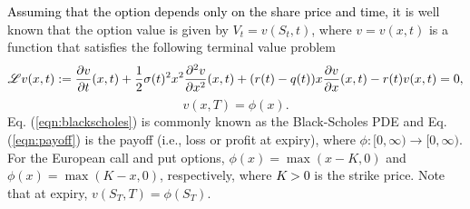 \textcolor{black}{Assuming that the option depends only on the share price and time,} it is well known that the option value is given by $V_t = v(S_t,t)$, where $v = v(x,t)$ is a function that satisfies the following terminal value problem
	\begin{equation}
		\label{eqn:blackscholes}
		\mathscr L v(x,t) := \frac{\partial v}{\partial t}(x,t) + \frac{1}{2}\sigma(t)^2x^2\frac{\partial^2 v}{\partial x^2}(x,t) + (r(t)-q(t))x\frac{\partial v}{\partial x}(x,t) - r(t)v(x,t) = 0,
	\end{equation}
	\begin{equation}
		\label{eqn:payoff}
		v(x,T) = \phi(x).
	\end{equation}
Eq. (\ref{eqn:blackscholes}) is commonly known as the Black-Scholes PDE and Eq. (\ref{eqn:payoff}) is the payoff (i.e., loss or profit at expiry), where $\phi : [0,\infty) \rightarrow [0, \infty)$. For the European call and put options, $\phi(x) = \max(x-K,0)$ and $\phi(x) = \max(K-x,0)$, respectively, where \textcolor{black}{$K > 0$} is the strike price. Note that at expiry, $v(S_T,T) = \phi(S_T)$.

